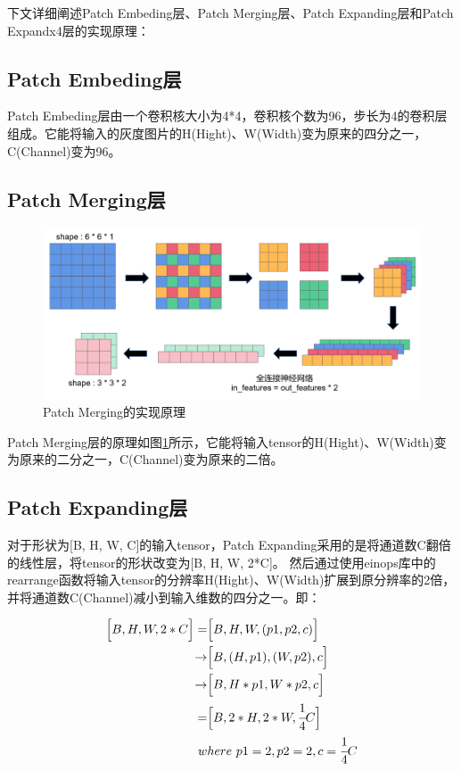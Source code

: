 下文详细阐述Patch Embeding层、Patch Merging层、Patch Expanding层和Patch Expandx4层的实现原理：

\subsection{Patch Embeding层}
Patch Embeding层由一个卷积核大小为4*4，卷积核个数为96，步长为4的卷积层组成。它能将输入的灰度图片的H(Hight)、W(Width)变为原来的四分之一，C(Channel)变为96。

\subsection{Patch Merging层}

\begin{figure}[h]
	\centering
	\includegraphics[width=0.9\columnwidth]{image/chap05/img503.png}
	\caption{Patch Merging的实现原理}
	\label{img503}
\end{figure}

Patch Merging层的原理如图\ref{img503}所示，它能将输入tensor的H(Hight)、W(Width)变为原来的二分之一，C(Channel)变为原来的二倍。

\subsection{Patch Expanding层}
对于形状为[B, H, W, C]的输入tensor，Patch Expanding采用的是将通道数C翻倍的线性层，将tensor的形状改变为[B, H, W, 2*C]。
然后通过使用einops库中的rearrange函数将输入tensor的分辨率H(Hight)、W(Width)扩展到原分辨率的2倍，并将通道数C(Channel)减小到输入维数的四分之一。即：

\begin{equation} \label{501}
	\begin{aligned}
		\Big [ B, H, W, 2*C \Big ] = & \Big [B, H, W, (p1, p2, c) \Big ]\\ 
		\rightarrow & \Big [  B, (H, p1), (W, p2), c \Big ] \\
		\rightarrow & \Big [ B, H*p1, W*p2, c \Big ] \\  = &\Big [ B, 2*H, 2*W, \cfrac{1}{4}C \Big ] \\ 
		w&here \  p1=2, p2=2, c=\cfrac{1}{4}C
	\end{aligned}
\end{equation}

